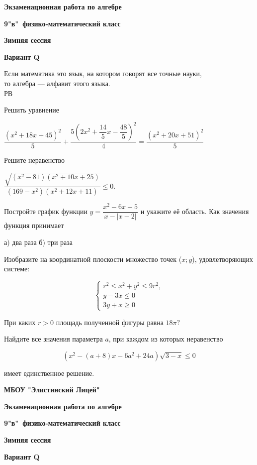 \centerline{\bf \Large Экзаменационная работа по алгебре}
\centerline{\bf \Large 9"в"\ физико-математический класс}
\centerline{\bf \Large Зимняя сессия}
\centerline{\bf \Large Вариант Q}

\begin{flushright}
        \scriptsize{Если математика это язык, на котором говорят все точные науки,\\то алгебра --- алфавит этого языка.\\РВ}
\end{flushright}

Решить уравнение 

$\dfrac{\left(x^2+18 x+45\right)^2}{5}+\dfrac{5\left(2 x^2+\dfrac{14}{5} x-\dfrac{48}{5}\right)^2}{4}=\dfrac{\left(x^2+20 x+51\right)^2}{5}$

Решите неравенство 

$\dfrac{\sqrt{\left(x^2-81\right)\left(x^2+10 x+25\right)}}{\left(169-x^2\right)\left(x^2+12 x+11\right)} \leqslant 0$.


Постройте график функции $y = \dfrac{x^2 - 6x + 5}{x - |x-2|}$ и укажите её область. Как значения функция принимает

а) два раза \qquad\qquad\qquad б) три раза

Изобразите на координатной плоскости множество точек ($x ; y$), удовлетворяющих системе:

$$
\left\{\begin{array}{l}
r^2 \leq x^2+y^2 \leq 9 r^2, \\
y-3 x \leq 0 \\
3 y+x \geq 0
\end{array}\right.
$$


При каких $r>0$ площадь полученной фигуры равна $18 \pi ?$

Найдите все значения параметра $a$, при каждом из которых неравенство

$$
\left(x^2-(a+8) x-6 a^2+24 a\right) \sqrt{3-x} \leqslant 0
$$

имеет единственное решение.


\hspace{3mm}

\centerline{\bf \large МБОУ "Элистинский Лицей"}


\newpage

\hspace{3mm}

\centerline{\bf \Large Экзаменационная работа по алгебре}
\centerline{\bf \Large 9"в"\ физико-математический класс}
\centerline{\bf \Large Зимняя сессия}
\centerline{\bf \Large Вариант Q}

